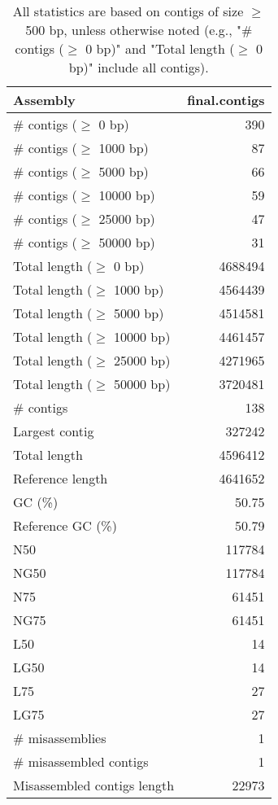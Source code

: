\documentclass[12pt,a4paper]{article}
\begin{document}
\begin{table}[ht]
\begin{center}
\caption{All statistics are based on contigs of size $\geq$ 500 bp, unless otherwise noted (e.g., "\# contigs ($\geq$ 0 bp)" and "Total length ($\geq$ 0 bp)" include all contigs).}
\begin{tabular}{|l*{1}{|r}|}
\hline
Assembly & final.contigs \\ \hline
\# contigs ($\geq$ 0 bp) & 390 \\ \hline
\# contigs ($\geq$ 1000 bp) & 87 \\ \hline
\# contigs ($\geq$ 5000 bp) & 66 \\ \hline
\# contigs ($\geq$ 10000 bp) & 59 \\ \hline
\# contigs ($\geq$ 25000 bp) & 47 \\ \hline
\# contigs ($\geq$ 50000 bp) & 31 \\ \hline
Total length ($\geq$ 0 bp) & 4688494 \\ \hline
Total length ($\geq$ 1000 bp) & 4564439 \\ \hline
Total length ($\geq$ 5000 bp) & 4514581 \\ \hline
Total length ($\geq$ 10000 bp) & 4461457 \\ \hline
Total length ($\geq$ 25000 bp) & 4271965 \\ \hline
Total length ($\geq$ 50000 bp) & 3720481 \\ \hline
\# contigs & 138 \\ \hline
Largest contig & 327242 \\ \hline
Total length & 4596412 \\ \hline
Reference length & 4641652 \\ \hline
GC (\%) & 50.75 \\ \hline
Reference GC (\%) & 50.79 \\ \hline
N50 & 117784 \\ \hline
NG50 & 117784 \\ \hline
N75 & 61451 \\ \hline
NG75 & 61451 \\ \hline
L50 & 14 \\ \hline
LG50 & 14 \\ \hline
L75 & 27 \\ \hline
LG75 & 27 \\ \hline
\# misassemblies & 1 \\ \hline
\# misassembled contigs & 1 \\ \hline
Misassembled contigs length & 22973 \\ \hline

\end{tabular}
\end{center}
\end{table}
\end{document}
